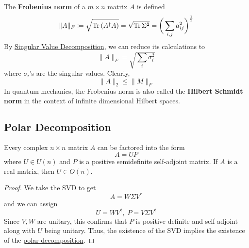  \begin{definition}
    \label{def:frobenius-norm-2}
    The \textbf{Frobenius norm} of a $m \times n$ matrix $A$ is defined
    \begin{equation}
      \|A\|_F \coloneqq \sqrt{\operatorname{Tr}{(A^\dagger A)}} = \sqrt{\operatorname{Tr}{\Sigma^2}} = \bigg( \sum_{i, j} a_{i j}^2 \bigg)^{\frac{1}{2}} 
    \end{equation}
    By \hyperref[thm:singular-value-decomposition]{Singular Value Decomposition}, we can reduce its calculations to
    \begin{equation}
      \|A\|_F = \sqrt{\sum_i \sigma_i^2}
    \end{equation}
    where $\sigma_i$'s are the singular values. Clearly, 
    \begin{equation}
      \|A\|_2 \leq \|M\|_F
    \end{equation}
    In quantum mechanics, the Frobenius norm is also called the \textbf{Hilbert Schmidt norm} in the context of infinite dimensional Hilbert spaces. 
  \end{definition}

\subsection{Polar Decomposition}

  \begin{theorem}
    \label{thm:polar-decomposition}
    Every complex $n \times n$ matrix $A$ can be factored into the form
    \begin{equation}
      A = U P
    \end{equation}
    where $U \in U(n)$ and $P$ is a positive semidefinite self-adjoint matrix. If $A$ is a real matrix, then $U \in O(n)$. 
  \end{theorem}
  \begin{proof}
    We take the SVD to get 
    \begin{equation}
      A = W \Sigma V^\dagger
    \end{equation}
    and we can assign 
    \begin{equation}
      U = W V^\dagger, \; P = V \Sigma V^\dagger
    \end{equation}
    Since $V, W$ are unitary, this confirms that $P$ is positive definite and self-adjoint along with $U$ being unitary. Thus, the existence of the SVD implies the existence of the \hyperref[thm:polar-decomposition]{polar decomposition}. 
  \end{proof}

